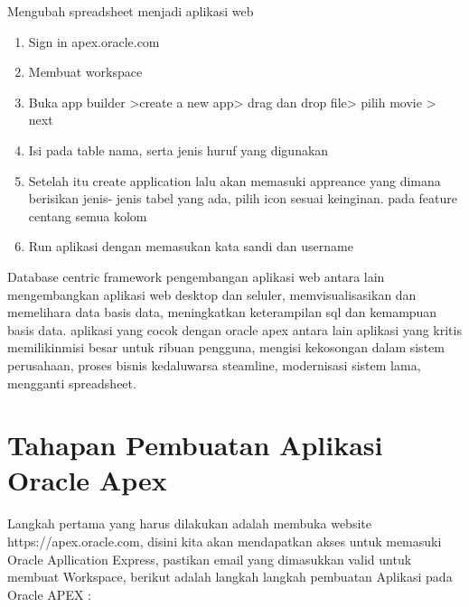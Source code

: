   Mengubah spreadsheet menjadi aplikasi web
  \begin{enumerate}
      \item Sign in apex.oracle.com
      \item Membuat workspace
      \item Buka app builder >create a new app>  drag dan drop file> pilih movie > next
      \item Isi pada table nama, serta jenis huruf yang digunakan
      \item Setelah itu create application lalu akan memasuki appreance yang dimana berisikan jenis- jenis tabel yang ada, pilih icon sesuai keinginan. pada feature centang semua kolom
      \item Run aplikasi dengan memasukan kata sandi dan username
      
  \end{enumerate}
\par
Database centric framework pengembangan aplikasi web antara lain mengembangkan aplikasi web desktop dan seluler, memvisualisasikan dan memelihara data basis data, meningkatkan keterampilan sql dan kemampuan basis data. aplikasi  yang cocok dengan oracle apex antara lain aplikasi  yang kritis  memilikinmisi besar untuk ribuan pengguna, mengisi kekosongan dalam sistem perusahaan, proses bisnis kedaluwarsa steamline, modernisasi sistem lama, mengganti spreadsheet. 



\section{Tahapan Pembuatan Aplikasi Oracle Apex}
Langkah pertama yang harus dilakukan adalah membuka website https://apex.oracle.com, disini kita akan mendapatkan akses untuk memasuki Oracle Apllication Express, pastikan email yang dimasukkan valid untuk membuat Workspace, berikut adalah langkah langkah pembuatan Aplikasi pada Oracle APEX :

